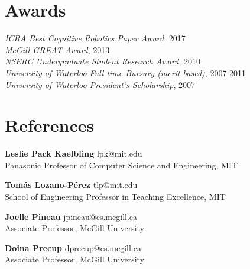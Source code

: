 \documentclass[line,margin,letterpaper]{res}
\begin{document}
\begin{resume}
\section{Awards}
{\sl ICRA Best Cognitive Robotics Paper Award}, 2017
\\
{\sl McGill GREAT Award}, 2013
\\
{\sl NSERC Undergraduate Student Research Award}, 2010
\\
{\sl University of Waterloo Full-time Bursary (merit-based)}, 2007-2011
\\
{\sl University of Waterloo President's Scholarship}, 2007

\section{References}

\textbf{Leslie Pack Kaelbling} {\small lpk@mit.edu}\\
Panasonic Professor of Computer Science and Engineering, MIT

\textbf{Tom\'{a}s Lozano-P\'{e}rez} {\small tlp@mit.edu}\\
School of Engineering Professor in Teaching Excellence, MIT

\textbf{Joelle Pineau} {\small jpineau@cs.mcgill.ca}\\
Associate Professor, McGill University

\textbf{Doina Precup} {\small dprecup@cs.mcgill.ca}\\
Associate Professor, McGill University
\end{resume}
\end{document}
